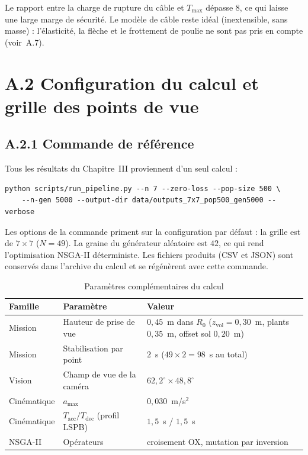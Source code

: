Le rapport entre la charge de rupture du câble et $T_{\max}$ dépasse $8$, ce qui laisse une large marge de sécurité. Le modèle de câble reste idéal (inextensible, sans masse) : l'élasticité, la flèche et le frottement de poulie ne sont pas pris en compte (voir~A.7).

\section*{A.2 Configuration du calcul et grille des points de vue}

\subsection*{A.2.1 Commande de référence}

Tous les résultats du Chapitre~III proviennent d'un seul calcul :
\begin{verbatim}
python scripts/run_pipeline.py --n 7 --zero-loss --pop-size 500 \
    --n-gen 5000 --output-dir data/outputs_7x7_pop500_gen5000 --verbose
\end{verbatim}

Les options de la commande priment sur la configuration par défaut : la grille est de $7\times7$ ($N = 49$). La graine du générateur aléatoire est $42$, ce qui rend l'optimisation NSGA-II déterministe. Les fichiers produits (CSV et JSON) sont conservés dans l'archive du calcul et se régénèrent avec cette commande.

\begin{table}[H]
\centering
\caption{Paramètres complémentaires du calcul}
\label{tab:A3}
\footnotesize
\begin{tabular}{|l|p{4.0cm}|p{6.5cm}|}
\hline
\textbf{Famille} & \textbf{Paramètre} & \textbf{Valeur} \\
\hline
Mission & Hauteur de prise de vue & $0{,}45$~m dans $R_0$ ($z_{\mathrm{vol}} = 0{,}30$~m, plants $0{,}35$~m, offset sol $0{,}20$~m) \\
\hline
Mission & Stabilisation par point & $2$~s ($49 \times 2 = 98$~s au total) \\
\hline
Vision & Champ de vue de la caméra & $62{,}2^\circ \times 48{,}8^\circ$ \\
\hline
Cinématique & $a_{\max}$ & $0{,}030$~m/s$^2$ \\
\hline
Cinématique & $T_{\mathrm{acc}} / T_{\mathrm{dec}}$ (profil LSPB) & $1{,}5$~s / $1{,}5$~s \\
\hline
NSGA-II & Opérateurs & croisement OX, mutation par inversion \\
\hline
\end{tabular}
\end{table}

